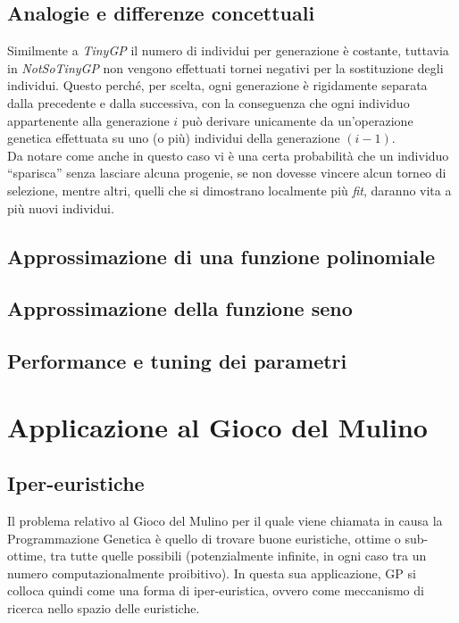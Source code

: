 \documentclass{../llncs}
\begin{document}
\subsection{Analogie e differenze concettuali}
Similmente a \emph{TinyGP} il numero di individui per generazione è costante, tuttavia in \emph{NotSoTinyGP} non vengono effettuati tornei negativi per la sostituzione degli individui. Questo perché, per scelta, ogni generazione è rigidamente separata dalla precedente e dalla successiva, con la conseguenza che ogni individuo appartenente alla generazione $i$ può derivare unicamente da un'operazione genetica effettuata su uno (o più) individui della generazione $(i-1)$.\\

Da notare come anche in questo caso vi è una certa probabilità che un individuo ``sparisca'' senza lasciare alcuna progenie, se non dovesse vincere alcun torneo di selezione, mentre altri, quelli che si dimostrano localmente più \emph{fit}, daranno vita a più nuovi individui.

\subsection{Approssimazione di una funzione polinomiale}
\subsection{Approssimazione della funzione seno}
\subsection{Performance e tuning dei parametri}

\section{Applicazione al Gioco del Mulino}
\subsection{Iper-euristiche}
Il problema relativo al Gioco del Mulino per il quale viene chiamata in causa la Programmazione Genetica è quello di trovare buone euristiche, ottime o sub-ottime, tra tutte quelle possibili (potenzialmente infinite, in ogni caso tra un numero computazionalmente proibitivo). In questa sua applicazione, GP si colloca quindi come una forma di iper-euristica, ovvero come meccanismo di ricerca nello spazio delle euristiche.
\end{document}
